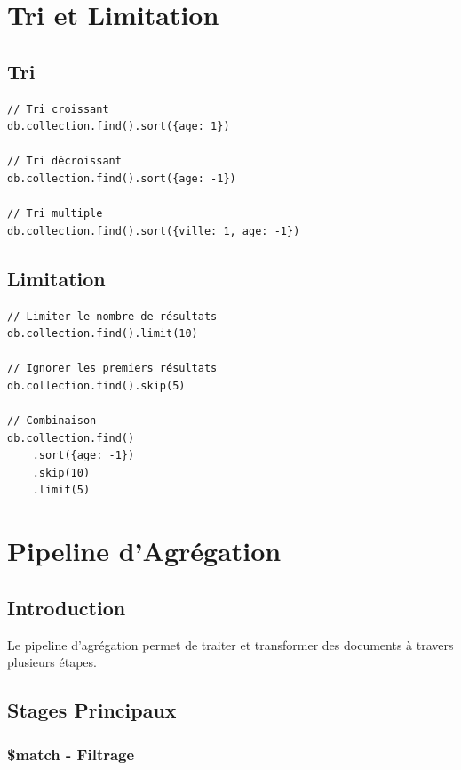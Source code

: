\documentclass[11pt,a4paper]{article}
\begin{document}
\newpage

\section{Tri et Limitation}

\subsection{Tri}

\begin{lstlisting}
// Tri croissant
db.collection.find().sort({age: 1})

// Tri décroissant
db.collection.find().sort({age: -1})

// Tri multiple
db.collection.find().sort({ville: 1, age: -1})
\end{lstlisting}

\subsection{Limitation}

\begin{lstlisting}
// Limiter le nombre de résultats
db.collection.find().limit(10)

// Ignorer les premiers résultats
db.collection.find().skip(5)

// Combinaison
db.collection.find()
    .sort({age: -1})
    .skip(10)
    .limit(5)
\end{lstlisting}

\newpage

\section{Pipeline d'Agrégation}

\subsection{Introduction}

Le pipeline d'agrégation permet de traiter et transformer des documents à travers plusieurs étapes.

\subsection{Stages Principaux}

\subsubsection{\$match - Filtrage}
\end{document}
